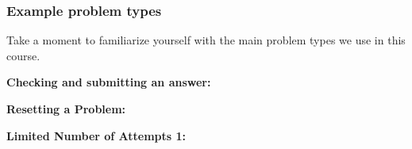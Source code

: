 \documentclass[pdftex, brazil, 12pt, twoside]{article}
\begin{document}
\subsubsection{Example problem types}
\label{gs-edx-example}

Take a moment to familiarize yourself with the main problem types we use in this
course.

\textbf{Checking and submitting an answer:}

\begin{figure}[H]
  \begin{center}
    \label{fig:exqst01}
  \end{center}
\end{figure}

\textbf{Resetting a Problem:}

\begin{figure}[H]
  \begin{center}
    \label{fig:exqst02}
  \end{center}
\end{figure}

\newpage
\textbf{Limited Number of Attempts 1:}
\end{document}
